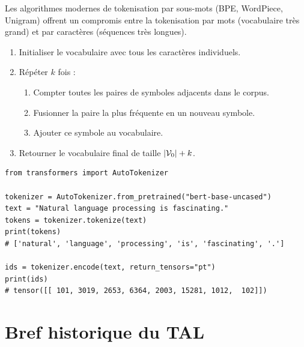 Les algorithmes modernes de tokenisation par sous-mots (BPE, WordPiece,
Unigram) offrent un compromis entre la tokenisation par mots (vocabulaire
tr\`es grand) et par caract\`eres (s\'equences tr\`es longues).

\begin{algorithme}[title=\textbf{Byte Pair Encoding (BPE)}]
\begin{enumerate}
    \item Initialiser le vocabulaire avec tous les caract\`eres individuels.
    \item R\'ep\'eter $k$ fois :
    \begin{enumerate}
        \item Compter toutes les paires de symboles adjacents dans le corpus.
        \item Fusionner la paire la plus fr\'equente en un nouveau symbole.
        \item Ajouter ce symbole au vocabulaire.
    \end{enumerate}
    \item Retourner le vocabulaire final de taille $\left| \mathcal{V}_0 \right| + k$.
\end{enumerate}
\end{algorithme}

\begin{codeblock}[title=\textbf{Tokenisation avec Hugging Face}]
\begin{verbatim}
from transformers import AutoTokenizer

tokenizer = AutoTokenizer.from_pretrained("bert-base-uncased")
text = "Natural language processing is fascinating."
tokens = tokenizer.tokenize(text)
print(tokens)
# ['natural', 'language', 'processing', 'is', 'fascinating', '.']

ids = tokenizer.encode(text, return_tensors="pt")
print(ids)
# tensor([[ 101, 3019, 2653, 6364, 2003, 15281, 1012,  102]])
\end{verbatim}
\end{codeblock}

\section{Bref historique du TAL}
\label{sec:intro:histoire}

